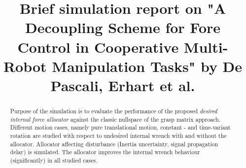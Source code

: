 \documentclass[conference]{IEEEtran}
\begin{document}
%
\title{Brief simulation report on "A Decoupling Scheme for Fore Control in Cooperative Multi-Robot Manipulation Tasks" by De Pascali, Erhart et al.}


\author{

}

\maketitle

\begin{abstract}
Purpose of the simulation is to evaluate the performance of the proposed \textit{desired internal force allocator} against the classic nullspace of the grasp matrix approach. Different motion cases, namely pure translational motion, constant - and time-variant rotation are studied with respect to undesired internal wrench with and without the allocator. Allocator affecting disturbance (Inertia uncertainty, signal propagation delay) is simulated. The allocator improves the internal wrench behaviour (significantly) in all studied cases.  
\end{abstract}
\end{document}
